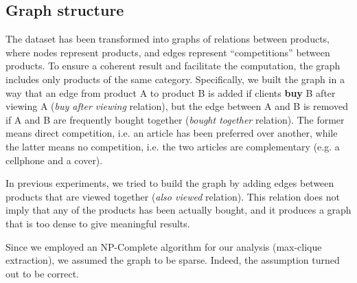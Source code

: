 \documentclass[11pt]{article}
\begin{document}
\subsection{Graph structure}
The dataset has been transformed into graphs of relations between products, where nodes represent products, and edges represent ``competitions'' between products. To ensure a coherent result and facilitate the computation, the graph includes only products of the same category. Specifically, we built the graph in a way that an edge from product A to product B is added if clients \textbf{buy} B after viewing A (\textit{buy after viewing} relation), but the edge between A and B is removed if A and B are frequently bought together (\textit{bought together} relation). The former means direct competition, i.e. an article has been preferred over another, while the latter means no competition, i.e. the two articles are complementary (e.g. a cellphone and a cover).

In previous experiments, we tried to build the graph by adding edges between products that are viewed together (\textit{also viewed} relation). This relation does not imply that any of the products has been actually bought, and it produces a graph that is too dense to give meaningful results. %

Since we employed an NP-Complete algorithm for our analysis (max-clique extraction), we assumed the graph to be sparse. Indeed, the assumption turned out to be correct.

\end{document}
